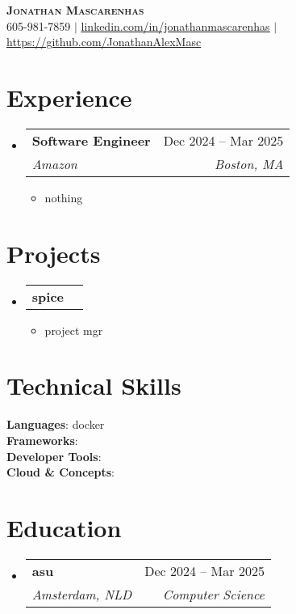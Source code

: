 \documentclass[letterpaper,11pt]{article}
\makeatletter
\newcommand{\resumeItem}[1]{
  \item\small{
    {#1 \vspace{-2pt}}
  }
}
\newcommand{\resumeSubheading}[4]{
  \vspace{-2pt}\item
    \begin{tabular*}{0.97\textwidth}[t]{l@{\extracolsep{\fill}}r}
      \textbf{#1} & #2 \\
      \textit{\small#3} & \textit{\small #4} \\
    \end{tabular*}\vspace{-7pt}
}
\newcommand{\resumeProjectHeading}[2]{
    \item
    \begin{tabular*}{0.97\textwidth}{l@{\extracolsep{\fill}}r}
      \small#1 & #2 \\
    \end{tabular*}\vspace{-7pt}
}
\newcommand{\resumeSubHeadingListStart}{\begin{itemize}[leftmargin=0.15in, label={}]}
\newcommand{\resumeSubHeadingListEnd}{\end{itemize}}
\newcommand{\resumeItemListStart}{\begin{itemize}}
\newcommand{\resumeItemListEnd}{\end{itemize}\vspace{-5pt}}
\makeatother
\begin{document}
\begin{center}
    \textbf{\Huge \scshape Jonathan Mascarenhas} \\ \vspace{1pt}
    \small 605-981-7859 $|$ 
    \href{https://linkedin.com/in/jonathanmascarenhas}{\underline{linkedin.com/in/jonathanmascarenhas}} $|$ 
    \href{https://github.com/JonathanAlexMasc}{\underline{https://github.com/JonathanAlexMasc}}
\end{center}

\section{Experience}
\resumeSubHeadingListStart

  \resumeSubheading
    {Software Engineer}{Dec 2024 -- Mar 2025}
    {Amazon}{Boston, MA}
    \resumeItemListStart
      \resumeItem{nothing}
    \resumeItemListEnd
  
\resumeSubHeadingListEnd

\section{Projects}
\resumeSubHeadingListStart

  \resumeProjectHeading
    {\textbf{spice}}{}
    \resumeItemListStart
      \resumeItem{project mgr}
    \resumeItemListEnd
  
\resumeSubHeadingListEnd

\section{Technical Skills}

\begin{itemize}[leftmargin=0.15in, label={}]
\small{\item{
  \textbf{Languages}{: docker} \\
  \textbf{Frameworks}{: } \\
  \textbf{Developer Tools}{: } \\
  \textbf{Cloud \& Concepts}{: }
}}
\end{itemize}


\section{Education}
\resumeSubHeadingListStart

  \resumeSubheading
    {asu}{Dec 2024 -- Mar 2025}
    {Amsterdam, NLD}{Computer Science}
  
\resumeSubHeadingListEnd
\end{document}
